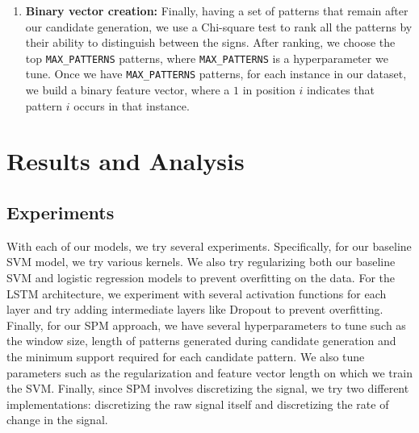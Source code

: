 \documentclass[twocolumn]{article}
\begin{document}
\begin{enumerate}
\item \textbf{Binary vector creation:} Finally, having a set of patterns that remain after our candidate generation, we use a Chi-square test to rank all the patterns by their ability to distinguish between the signs. After ranking, we choose the top \texttt{MAX\_PATTERNS} patterns, where \texttt{MAX\_PATTERNS} is a hyperparameter we tune. Once we have \texttt{MAX\_PATTERNS} patterns, for each instance in our dataset, we build a binary feature vector, where a $1$ in position $i$ indicates that pattern $i$ occurs in that instance. 
\end{enumerate}

\section{Results and Analysis}
\subsection{Experiments}
With each of our models, we try several experiments. Specifically, for our baseline SVM model, we try various kernels. We also try regularizing both our baseline SVM and logistic regression models to prevent overfitting on the data. For the LSTM architecture, we experiment with several activation functions for each layer and try adding intermediate layers like Dropout to prevent overfitting. Finally, for our SPM approach, we have several hyperparameters to tune such as the window size, length of patterns generated during candidate generation and the minimum support required for each candidate pattern. We also tune parameters such as the regularization and feature vector length on which we train the SVM. Finally, since SPM involves discretizing the signal, we try two different implementations: discretizing the raw signal itself and discretizing the rate of change in the signal.
\end{document}
